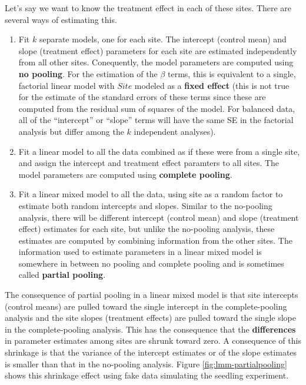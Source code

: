 \documentclass[]{book}
\begin{document}
Let's say we want to know the treatment effect in each of these sites.
There are several ways of estimating this.

\begin{enumerate}
\def\labelenumi{\arabic{enumi}.}
\item
  Fit \(k\) separate models, one for each site. The intercept (control
  mean) and slope (treatment effect) parameters for each site are
  estimated independently from all other sites. Conequently, the model
  parameters are computed using \textbf{no pooling}. For the estimation
  of the \(\beta\) terms, this is equivalent to a single, factorial
  linear model with \(Site\) modeled as a \textbf{fixed effect} (this is
  not true for the estimate of the standard errors of these terms since
  these are computed from the residual sum of squares of the model. For
  balanced data, all of the ``intercept'' or ``slope'' terms will have
  the same SE in the factorial analysis but differ among the \(k\)
  independent analyses).
\item
  Fit a linear model to all the data combined as if these were from a
  single site, and assign the intercept and treatment effect paramters
  to all sites. The model parameters are computed using \textbf{complete
  pooling}.
\item
  Fit a linear mixed model to all the data, using site as a random
  factor to estimate both random intercepts and slopes. Similar to the
  no-pooling analysis, there will be different intercept (control mean)
  and slope (treatment effect) estimates for each site, but unlike the
  no-pooling analysis, these estimates are computed by combining
  information from the other sites. The information used to estimate
  parameters in a linear mixed model is somewhere in between no pooling
  and complete pooling and is sometimes called \textbf{partial pooling}.
\end{enumerate}

The consequence of partial pooling in a linear mixed model is that site
intercepts (control means) are pulled toward the single intercept in the
complete-pooling analysis and the site slopes (treatment effects) are
pulled toward the single slope in the complete-pooling analysis. This
has the consequence that the \textbf{differences} in parameter estimates
among sites are shrunk toward zero. A consequence of this shrinkage is
that the variance of the intercept estimates or of the slope estimates
is smaller than that in the no-pooling analysis. Figure
\ref{fig:lmm-partialpooling} shows this shrinkage effect using fake data
simulating the seedling experiment.
\end{document}
